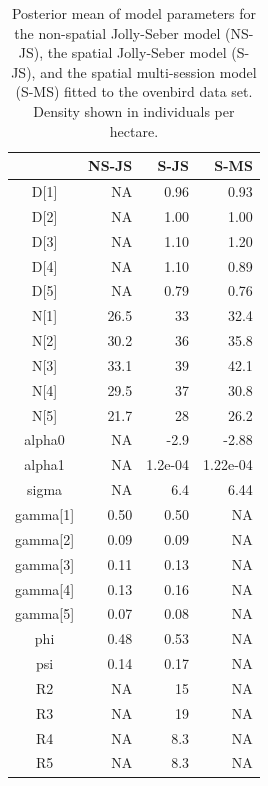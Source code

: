 \begin{table}
\centering
\caption{
Posterior mean of model parameters for the non-spatial Jolly-Seber 
model (NS-JS), the spatial Jolly-Seber model (S-JS),
and the spatial multi-session model (S-MS) fitted to the
ovenbird data set.  Density shown in individuals per hectare.
}

\begin{tabular}{crrr}
\hline \hline
    &   NS-JS &   S-JS   &   S-MS \\  \hline
D[1]    &  NA & 0.96 &  0.93   \\
D[2]     & NA & 1.00 &  1.00  \\
D[3]   &   NA & 1.10 &  1.20  \\
D[4]   &   NA & 1.10 &  0.89 \\
D[5]   &   NA & 0.79  & 0.76  \\
N[1]   &  26.5 &  33 &  32.4  \\
N[2]   &  30.2 &  36 &  35.8  \\
N[3]    & 33.1 &  39 &  42.1 \\
N[4]   &  29.5 &  37 &  30.8 \\
N[5]   &   21.7 & 28 &  26.2 \\
alpha0 &   NA & -2.9 & -2.88  \\
alpha1  &   NA & 1.2e-04 & 1.22e-04  \\
sigma  &   NA &  6.4 & 6.44 \\
gamma[1]  & 0.50 &  0.50 & NA \\
gamma[2] &  0.09  & 0.09 & NA \\
gamma[3] &  0.11 & 0.13 & NA \\
gamma[4] &  0.13 & 0.16 & NA \\
gamma[5] &  0.07 & 0.08 & NA \\
phi   &  0.48 &   0.53 & NA \\
psi   &  0.14 &  0.17 & NA \\
R2    &  NA &   15 & NA \\
R3    &   NA &   19 & NA \\
R4    &   NA &   8.3 & NA \\  
R5    &   NA &   8.3 & NA \\ \hline
\end{tabular}
\label{open.tab.JSmulti}
\end{table}


